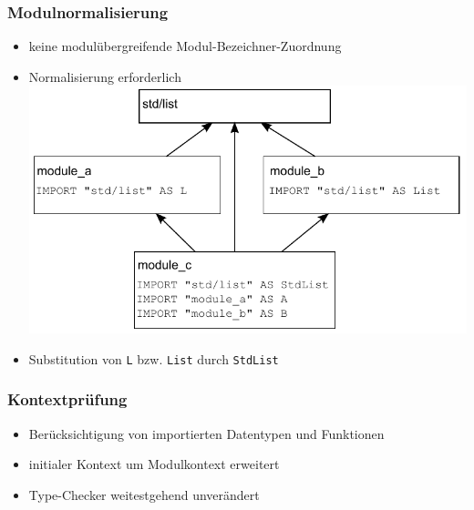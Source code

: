 \begin{frame}[containsverbatim=true]
\frametitle{Modulnormalisierung}

\begin{itemize}
\item keine modulübergreifende Modul-Bezeichner-Zuordnung
\item Normalisierung erforderlich
\includegraphics[width=1\linewidth]{depsModABC}
\item Substitution von \verb+L+ bzw. \verb+List+ durch \verb+StdList+
\end{itemize}


\end{frame}


\begin{frame}
\frametitle{Kontextprüfung}

\begin{itemize}
\item Berücksichtigung von importierten Datentypen und Funktionen
\item initialer Kontext um Modulkontext erweitert
\item Type-Checker weitestgehend unverändert
\end{itemize}

\end{frame}
